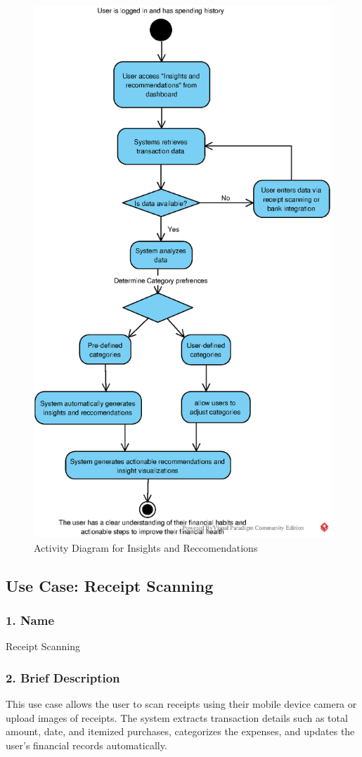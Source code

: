 \newpage

\begin{figure}[!h]
    \centering
    \includegraphics[width=0.5\linewidth]{eps/PFPActivityDiagramUC2.png.eps}
    \caption{Activity Diagram for Insights and Reccomendations}
    \label{fig:enter-label}
\end{figure}

\newpage

\subsection*{Use Case: Receipt Scanning}
\begin{useCase}
\end{useCase}

\subsubsection*{1. Name}
Receipt Scanning

\subsubsection*{2. Brief Description}
This use case allows the user to scan receipts using their mobile device camera or upload images of receipts. The system extracts transaction details such as total amount, date, and itemized purchases, categorizes the expenses, and updates the user's financial records automatically.

